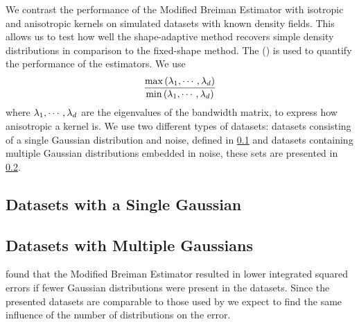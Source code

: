 We contrast the performance of the Modified Breiman Estimator with isotropic and anisotropic kernels on simulated datasets with known density fields. This allows us to test how well the shape-adaptive method recovers simple density distributions in comparison to the fixed-shape method. 
The \mse (\MSE) is used to quantify the performance of the estimators. We use
\begin{equation*}\label{eq:experiment:anisotropicmetric}
	\frac{\max\left(\lambda_1, \cdots, \lambda_d \right)}{\min\left(\lambda_1, \cdots, \lambda_d \right)}
\end{equation*}
where $\lambda_1, \cdots, \lambda_d$ are the eigenvalues of the bandwidth matrix, to express how anisotropic a kernel is.
We use two different types of datasets: datasets consisting of a single Gaussian distribution and noise, defined in \cref{s:experiment:singlesphere} and datasets containing multiple Gaussian distributions embedded in noise, these sets are presented in \cref{s:experiment:multisphere}.

\subsection{Datasets with a Single Gaussian}
\label{s:experiment:singlesphere}


\subsection{Datasets with Multiple Gaussians}
\label{s:experiment:multisphere}


\textcite{ferdosi2011comparison} found that the Modified Breiman Estimator resulted in lower integrated squared errors if fewer Gaussian distributions were present in the datasets. Since the presented datasets are comparable to those used by \citeauthor{ferdosi2011comparison} we expect to find the same influence of the number of distributions on the error.
